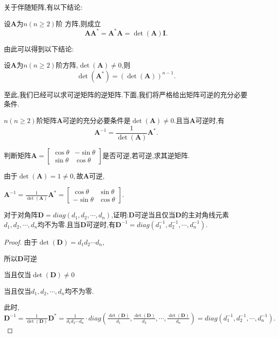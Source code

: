 关于伴随矩阵,有以下结论:
\begin{theorem}
	设$\mathbf{A}$为$n(n\ge2)$阶 方阵,则成立
	\[
		\mathbf{AA^{\ast}}=\mathbf{A^{\ast}A}=\det (\mathbf{A})\mathbf{I}.
	\]
\end{theorem}
由此可以得到以下结论:
\begin{theorem}
	设$\mathbf{A}$为$n(n\ge2)$阶方阵,$\det (\mathbf{A})\ne 0$,则
	\[
		\det(\mathbf{A}^{\ast})=(\det(\mathbf{A}))^{n-1}.
	\]
\end{theorem}
至此,我们已经可以求可逆矩阵的逆矩阵.下面,我们将严格给出矩阵可逆的充分必要条件.
\begin{theorem}
	$n(n\ge2)$阶矩阵$\mathbf{A}$可逆的充分必要条件是$\det(\mathbf{A})\ne0$.且当$\mathbf{A}$可逆时,有
	\[
		\mathbf{A}^{-1}=\frac{1}{\det(\mathbf{A})}\mathbf{A}^{\ast}.
	\]
\end{theorem}

\begin{example}
	判断矩阵$\mathbf{A} = \begin{bmatrix} {{\cos\theta}} & {{-\sin\theta}}\\ {{\sin\theta}}  & {{\cos\theta}} \end{bmatrix}$是否可逆,若可逆,求其逆矩阵.
\end{example}
\begin{solution}
	由于$\det(\mathbf{A})=1\ne0,$故$\mathbf{A}$可逆,

	$
		\mathbf{A}^{-1}=\frac{1}{\det(\mathbf{A})}\mathbf{A}^{\ast}=\begin{bmatrix} {{\cos\theta}} & {{\sin\theta}}\\ {{-\sin\theta}}  & {{\cos\theta}} \end{bmatrix}.
	$
\end{solution}

\begin{example}
	对于对角阵$\mathbf{D}=diag(d_1,d_2,\cdots,d_n)$,证明:$\mathbf{D}$可逆当且仅当$\mathbf{D}$的主对角线元素$d_1,d_2,\cdots,d_n$均不为零.且当$\mathbf{D}$可逆时,有$\mathbf{D}^{-1}=diag(d_{1}^{-1},d_{2}^{-1},\cdots,d_{n}^{-1}).$
\end{example}
\begin{proof}
	由于$\det(\mathbf{D})=d_1d_2\cdots d_n$,

	所以$\mathbf{D}$可逆

	当且仅当$\det(\mathbf{D})\ne0$

	当且仅当$d_1,d_2,\cdots,d_n$均不为零.

	此时,$\mathbf{D}^{-1}=\frac{1}{\det(\mathbf{D})}\mathbf{D}^{\ast}=\frac{1}{d_1d_2\cdots d_n}\cdot diag(\frac{\det(\mathbf{D})}{d_1},\frac{\det(\mathbf{D})}{d_2},\cdots,\frac{\det(\mathbf{D})}{d_n})=diag(d_{1}^{-1},d_{2}^{-1},\cdots,d_{n}^{-1}).$
\end{proof}

